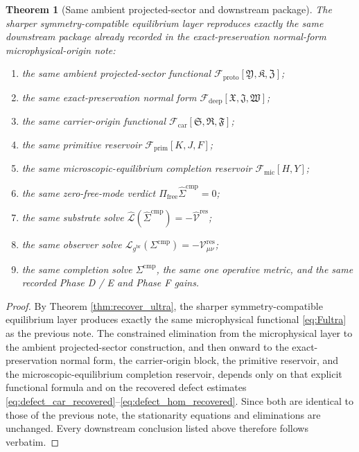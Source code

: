 \documentclass[11pt]{article}
\newcommand{\ObserverMetric}{g^{\mathrm{br}}}
\newcommand{\CompShift}{\Sigma^{\mathrm{cmp}}}
\newcommand{\CompLift}{\widehat\Sigma^{\mathrm{cmp}}}
\newcommand{\ResidualCore}{\mathcal V_{\mu\nu}^{\mathrm{res}}}
\newcommand{\ResidualLift}{\widehat{\mathcal V}^{\mathrm{res}}}
\newcommand{\SubReducedEin}{\widehat{\mathcal L}}
\newcommand{\FreeProj}{\Pi_{\mathrm{free}}}
\newcommand{\GaugeAux}{Y}
\newcommand{\ReducedEin}{\mathcal L_{\ObserverMetric}}
\newcommand{\MicFunctional}{\mathscr F_{\mathrm{mic}}}
\newcommand{\PrimFunctional}{\mathscr F_{\mathrm{prim}}}
\newcommand{\CarrierFunctional}{\mathscr F_{\mathrm{car}}}
\newcommand{\DeepFunctional}{\mathscr F_{\mathrm{deep}}}
\newcommand{\ProtoFunctional}{\mathscr F_{\mathrm{proto}}}
\newcommand{\PrimStrain}{K}
\newcommand{\PrimNeutral}{J}
\newcommand{\PrimFree}{F}
\newcommand{\CarrierSeed}{\mathfrak S}
\newcommand{\RelabelSeed}{\mathfrak R}
\newcommand{\FreeSeed}{\mathfrak F}
\newcommand{\DeepTensor}{\mathfrak X}
\newcommand{\DeepRelabel}{\mathfrak J}
\newcommand{\DeepFree}{\mathfrak W}
\newcommand{\ProtoTensor}{\mathfrak Y}
\newcommand{\ProtoRelabel}{\mathfrak K}
\newcommand{\ProtoFree}{\mathfrak Z}
\newtheorem{theorem}{Theorem}
\begin{document}
\begin{theorem}[Same ambient projected-sector and downstream package]
\label{thm:same_package}
The sharper symmetry-compatible equilibrium layer reproduces exactly the same downstream package already recorded in the exact-preservation normal-form microphysical-origin note:
\begin{enumerate}
    \item the same ambient projected-sector functional \(\ProtoFunctional[\ProtoTensor,\ProtoRelabel,\ProtoFree]\);
    \item the same exact-preservation normal form \(\DeepFunctional[\DeepTensor,\DeepRelabel,\DeepFree]\);
    \item the same carrier-origin functional \(\CarrierFunctional[\CarrierSeed,\RelabelSeed,\FreeSeed]\);
    \item the same primitive reservoir \(\PrimFunctional[\PrimStrain,\PrimNeutral,\PrimFree]\);
    \item the same microscopic-equilibrium completion reservoir \(\MicFunctional[H,\GaugeAux]\);
    \item the same zero-free-mode verdict \(\FreeProj\CompLift=0\);
    \item the same substrate solve \(\SubReducedEin(\CompLift)=-\ResidualLift\);
    \item the same observer solve \(\ReducedEin(\CompShift)=-\ResidualCore\);
    \item the same completion solve \(\Sigma^{\mathrm{cmp}}\), the same one operative metric, and the same recorded Phase D / E and Phase F gains.
\end{enumerate}
\end{theorem}

\begin{proof}
By Theorem \ref{thm:recover_ultra}, the sharper symmetry-compatible equilibrium layer produces exactly the same microphysical functional \eqref{eq:Fultra} as the previous note. The constrained elimination from the microphysical layer to the ambient projected-sector construction, and then onward to the exact-preservation normal form, the carrier-origin block, the primitive reservoir, and the microscopic-equilibrium completion reservoir, depends only on that explicit functional formula and on the recovered defect estimates \eqref{eq:defect_car_recovered}--\eqref{eq:defect_hom_recovered}. Since both are identical to those of the previous note, the stationarity equations and eliminations are unchanged. Every downstream conclusion listed above therefore follows verbatim.
\end{proof}
\end{document}
